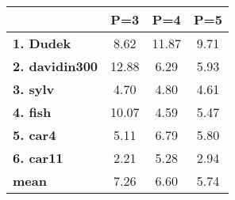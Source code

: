 \begin{tabular}{|l|c|c|c|}
\hline
&\textbf{P=3}&\textbf{P=4}&\textbf{P=5}\\\hline
\textbf{1. Dudek}&8.62&11.87&9.71\\\hline
\textbf{2. davidin300}&12.88&6.29&5.93\\\hline
\textbf{3. sylv}&4.70&4.80&4.61\\\hline
\textbf{4. fish}&10.07&4.59&5.47\\\hline
\textbf{5. car4}&5.11&6.79&5.80\\\hline
\textbf{6. car11}&2.21&5.28&2.94\\\hline
\textbf{mean}&7.26&6.60&5.74\\\hline
\end{tabular}
